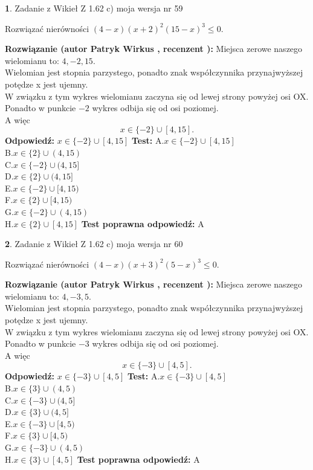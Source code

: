 \documentclass[12pt, a4paper]{article}
\theoremstyle{definition} %
\newtheorem{zad}{}
\newcommand{\zadStart}[1]{\begin{zad}#1\newline}
\newcommand{\zadStop}{\end{zad}}
\newcommand{\rozwStart}[2]{\noindent \textbf{Rozwiązanie (autor #1 , recenzent #2): }\newline}
\newcommand{\rozwStop}{\newline}
\newcommand{\odpStart}{\noindent \textbf{Odpowiedź:}\newline}
\newcommand{\odpStop}{\newline}
\newcommand{\testStart}{\noindent \textbf{Test:}\newline}
\newcommand{\testStop}{\newline}
\newcommand{\kluczStart}{\noindent \textbf{Test poprawna odpowiedź:}\newline}
\newcommand{\kluczStop}{\newline}
\begin{document}
\zadStart{Zadanie z Wikieł Z 1.62 c) moja wersja nr 59}

Rozwiązać nierówności $(4-x)(x+2)^{2}(15-x)^{3}\le0$.
\zadStop
\rozwStart{Patryk Wirkus}{}
Miejsca zerowe naszego wielomianu to: $4, -2, 15$.\\
Wielomian jest stopnia parzystego, ponadto znak współczynnika przy\linebreak najwyższej potędze x jest ujemny.\\ W związku z tym wykres wielomianu zaczyna się od lewej strony powyżej osi OX.\\
Ponadto w punkcie $-2$ wykres odbija się od osi poziomej.\\
A więc $$x \in \{-2\} \cup [4,15].$$
\rozwStop
\odpStart
$x \in \{-2\} \cup [4,15]$
\odpStop
\testStart
A.$x \in \{-2\} \cup [4,15]$\\
B.$x \in \{2\} \cup (4,15)$\\
C.$x \in \{-2\} \cup (4,15]$\\
D.$x \in \{2\} \cup (4,15]$\\
E.$x \in \{-2\} \cup [4,15)$\\
F.$x \in \{2\} \cup [4,15)$\\
G.$x \in \{-2\} \cup (4,15)$\\
H.$x \in \{2\} \cup [4,15]$
\testStop
\kluczStart
A
\kluczStop



\zadStart{Zadanie z Wikieł Z 1.62 c) moja wersja nr 60}

Rozwiązać nierówności $(4-x)(x+3)^{2}(5-x)^{3}\le0$.
\zadStop
\rozwStart{Patryk Wirkus}{}
Miejsca zerowe naszego wielomianu to: $4, -3, 5$.\\
Wielomian jest stopnia parzystego, ponadto znak współczynnika przy\linebreak najwyższej potędze x jest ujemny.\\ W związku z tym wykres wielomianu zaczyna się od lewej strony powyżej osi OX.\\
Ponadto w punkcie $-3$ wykres odbija się od osi poziomej.\\
A więc $$x \in \{-3\} \cup [4,5].$$
\rozwStop
\odpStart
$x \in \{-3\} \cup [4,5]$
\odpStop
\testStart
A.$x \in \{-3\} \cup [4,5]$\\
B.$x \in \{3\} \cup (4,5)$\\
C.$x \in \{-3\} \cup (4,5]$\\
D.$x \in \{3\} \cup (4,5]$\\
E.$x \in \{-3\} \cup [4,5)$\\
F.$x \in \{3\} \cup [4,5)$\\
G.$x \in \{-3\} \cup (4,5)$\\
H.$x \in \{3\} \cup [4,5]$
\testStop
\kluczStart
A
\kluczStop
\end{document}
